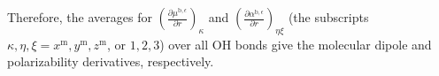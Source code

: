 
Therefore, the averages for $(\frac{\partial \mu^{\text{b},\epsilon}}{\partial r})_\kappa$ and $(\frac{\partial \alpha^{\text{b},\epsilon}}{\partial r})_{\eta\xi}$ 
(the subscripts $\kappa, \eta, \xi = x^{\text{m}}, y^{\text{m}}, z^{\text{m}}$, or $1, 2, 3$) over all OH bonds give the molecular dipole and polarizability derivatives, respectively. 


